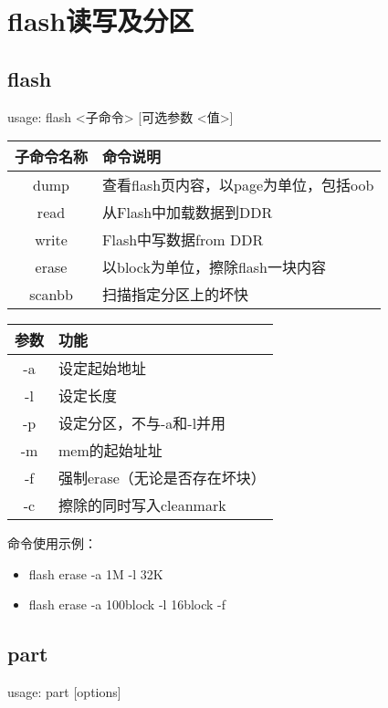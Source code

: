 \section{flash读写及分区}
\subsection{flash}
usage: flash <子命令> [可选参数 <值>]

\begin{table}[H]
\setlength{\parindent}{0pt}
\begin{tabular}{|c|l|} \hline
子命令名称 & 命令说明 \\ \hline
dump & 查看flash页内容，以page为单位，包括oob \\ \hline
read & 从Flash中加载数据到DDR \\ \hline
write & Flash中写数据from DDR \\ \hline
erase & 以block为单位，擦除flash一块内容 \\ \hline
scanbb & 扫描指定分区上的坏快 \\ \hline
\end{tabular}
\end{table}

\begin{table}[H]
\setlength{\parindent}{0pt}
\begin{tabular}{|c|l|} \hline
参数 & 功能 \\ \hline
-a & 设定起始地址\\ \hline
-l & 设定长度\\ \hline
-p & 设定分区，不与-a和-l并用\\ \hline
-m & mem的起始址址\\ \hline
-f & 强制erase（无论是否存在坏块）\\ \hline
-c & 擦除的同时写入cleanmark\\ \hline
\end{tabular}
\end{table}

命令使用示例：\\
\begin{itemize}
\item flash erase -a 1M -l 32K
\item flash erase -a 100block -l 16block -f
\end{itemize}

\subsection{part}
usage: part [options]

